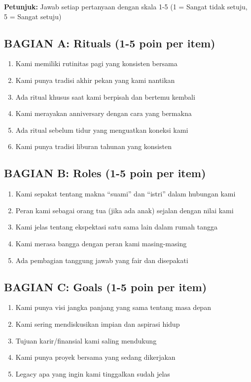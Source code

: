 \begin{exercisebox}
\textbf{Petunjuk:} Jawab setiap pertanyaan dengan skala 1-5 (1 = Sangat tidak setuju, 5 = Sangat setuju)

\subsection*{BAGIAN A: Rituals (1-5 poin per item)}
\begin{enumerate}
    \item Kami memiliki rutinitas pagi yang konsisten bersama
    \item Kami punya tradisi akhir pekan yang kami nantikan
    \item Ada ritual khusus saat kami berpisah dan bertemu kembali
    \item Kami merayakan anniversary dengan cara yang bermakna
    \item Ada ritual sebelum tidur yang menguatkan koneksi kami
    \item Kami punya tradisi liburan tahunan yang konsisten
\end{enumerate}

\subsection*{BAGIAN B: Roles (1-5 poin per item)}
\begin{enumerate}
    \item[7.] Kami sepakat tentang makna ``suami'' dan ``istri'' dalam hubungan kami
    \item[8.] Peran kami sebagai orang tua (jika ada anak) sejalan dengan nilai kami
    \item[9.] Kami jelas tentang ekspektasi satu sama lain dalam rumah tangga
    \item[10.] Kami merasa bangga dengan peran kami masing-masing
    \item[11.] Ada pembagian tanggung jawab yang fair dan disepakati
\end{enumerate}

\subsection*{BAGIAN C: Goals (1-5 poin per item)}
\begin{enumerate}
    \item[12.] Kami punya visi jangka panjang yang sama tentang masa depan
    \item[13.] Kami sering mendiskusikan impian dan aspirasi hidup
    \item[14.] Tujuan karir/finansial kami saling mendukung
    \item[15.] Kami punya proyek bersama yang sedang dikerjakan
    \item[16.] Legacy apa yang ingin kami tinggalkan sudah jelas
\end{enumerate}


\end{exercisebox}
